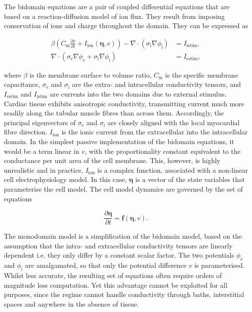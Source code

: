    The bidomain equations are a pair of coupled differential equations that are based on a reaction-diffusion model of ion flux. They result from imposing conservation of ions and charge throughout the domain. They can be expressed as
  
    \begin{align}
      \beta \left( C_\text{m}\frac{\partial v}{\partial t} + I_\text{ion}\left( \boldsymbol\eta, v \right) \right) - \nabla \cdot \left( \sigma_\text{i} \nabla \phi_\text{i} \right) &= I_\text{istim}, \\
        \nabla \cdot \left( \sigma_\text{e} \nabla \phi_\text{e} +  \sigma_\text{i} \nabla \phi_\text{i} \right) &= I_\text{estim},
    \end{align} 
  
    where $\beta$ is the membrane surface to volume ratio, $C_\text{m}$ is the specific membrane capacitance, $\sigma_\text{e}$ and $\sigma_\text{i}$ are the extra- and intracellular conductivity tensors, and $I_\text{estim}$ and $I_\text{istim}$ are currents into the two domains due to external stimulus. Cardiac tissue exhibits anisotropic conductivity, transmitting current much more readily along the tubular muscle fibres than across them. Accordingly, the principal eigenvectors of $\sigma_\text{e}$ and $\sigma_\text{i}$ are closely aligned with the local myocardial fibre direction. $I_\text{ion}$ is the ionic current from the extracellular into the intracellular domain. In the simplest passive implementation of the bidomain equations, it would be a term linear in $v$, with the proportionality constant equivalent to the conductance per unit area of the cell membrane. This, however, is highly unrealistic and in practice, $I_\text{ion}$ is a complex function, associated with a non-linear cell electrophysiology model. In this case, $\boldsymbol\eta$ is a vector of the state variables that parameterise the cell model. The cell model dynamics are governed by the set of equations
  
    \begin{equation}
      \frac{\partial \boldsymbol\eta}{\partial t} = \mathbf{f}\left(\boldsymbol\eta, v \right).
    \end{equation}
  
    The monodomain model is a simplification of the bidomain model, based on the assumption that the intra- and extracellular conductivity tensors are linearly dependent i.e. they only differ by a constant scalar factor. The two potentials $\phi_\text{e}$ and $\phi_\text{i}$ are amalgamated, so that only the potential difference $v$ is parameterised. Whilst less accurate, the resulting set of equations often require orders of magnitude less computation. Yet this advantage cannot be exploited for all purposes, since the regime cannot handle conductivity through baths, interstitial spaces and anywhere in the absence of tissue.
    
